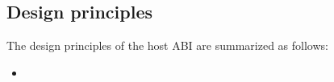 



\subsection{Design principles}


The design principles of the host ABI are summarized as follows:

\begin{itemize}
	
\item 


\end{itemize}


